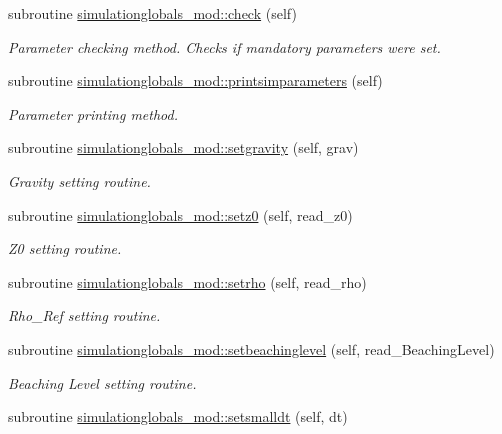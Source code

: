 \begin{DoxyCompactItemize}
subroutine \mbox{\hyperlink{namespacesimulationglobals__mod_a3d337e9c28136dd9c67fa576f05cd44b}{simulationglobals\+\_\+mod\+::check}} (self)
\begin{DoxyCompactList}\small\item\em Parameter checking method. Checks if mandatory parameters were set. \end{DoxyCompactList}\item 
subroutine \mbox{\hyperlink{namespacesimulationglobals__mod_ab67964fe7c3fb20a4ce0b4193520aa1d}{simulationglobals\+\_\+mod\+::printsimparameters}} (self)
\begin{DoxyCompactList}\small\item\em Parameter printing method. \end{DoxyCompactList}\item 
subroutine \mbox{\hyperlink{namespacesimulationglobals__mod_ae6b88d15ddc389aedd73d600de0337df}{simulationglobals\+\_\+mod\+::setgravity}} (self, grav)
\begin{DoxyCompactList}\small\item\em Gravity setting routine. \end{DoxyCompactList}\item 
subroutine \mbox{\hyperlink{namespacesimulationglobals__mod_a36c2833caae3767434115cc966fe2c5d}{simulationglobals\+\_\+mod\+::setz0}} (self, read\+\_\+z0)
\begin{DoxyCompactList}\small\item\em Z0 setting routine. \end{DoxyCompactList}\item 
subroutine \mbox{\hyperlink{namespacesimulationglobals__mod_a7d41fc05216d326ae8c0b090362430d3}{simulationglobals\+\_\+mod\+::setrho}} (self, read\+\_\+rho)
\begin{DoxyCompactList}\small\item\em Rho\+\_\+\+Ref setting routine. \end{DoxyCompactList}\item 
subroutine \mbox{\hyperlink{namespacesimulationglobals__mod_a3b24d0338ee34782c8e2ab57bba7b5f6}{simulationglobals\+\_\+mod\+::setbeachinglevel}} (self, read\+\_\+\+Beaching\+Level)
\begin{DoxyCompactList}\small\item\em Beaching Level setting routine. \end{DoxyCompactList}\item 
subroutine \mbox{\hyperlink{namespacesimulationglobals__mod_ad36c21a592a3230ce848804075abc97e}{simulationglobals\+\_\+mod\+::setsmalldt}} (self, dt)

\end{DoxyCompactItemize}

